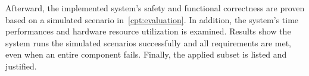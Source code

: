 Afterward, the implemented system's safety and functional correctness are proven based on a simulated  scenario in~\autoref{cpt:evaluation}.
In addition, the system's time performances and hardware resource utilization is examined.
Results show the system runs the simulated scenarios successfully and all requirements are met, even when an entire component fails.
Finally, the applied  subset is listed and justified.



